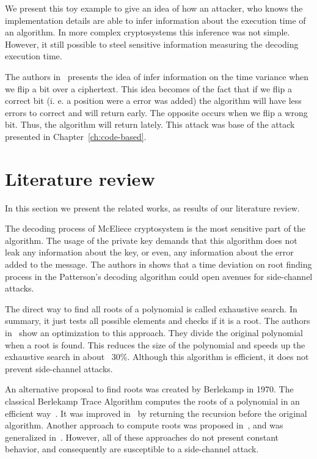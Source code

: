 We present this toy example to give an idea of how an attacker, who knows the implementation details are able to infer information about the execution time of an algorithm. In more complex cryptosystems this inference was not simple. However, it still possible to steel sensitive information measuring the decoding execution time.

The authors in~\cite{shoufan2009timing} presents the idea of infer information on the time variance when we flip a bit over a ciphertext. This idea becomes of the fact that if we flip a correct bit (i. e. a position were a error was added) the algorithm will have less errors to correct and will return early. The opposite occurs when we flip a wrong bit. Thus, the algorithm will return lately. This attack was base of the attack presented in Chapter~\ref{ch:code-based}.


\section{Literature review}
In this section we present the related works, as results of our literature review.

The decoding process of McEliece cryptosystem is the most sensitive part of the algorithm. The usage of the private key demands that this algorithm does not leak any information about the key, or even, any information about the error added to the message. The authors in \cite{bucerzan2017improved} shows that a time deviation on root finding process in the Patterson's decoding algorithm could open avenues for side-channel attacks. 

The direct way to find all roots of a polynomial is called exhaustive search. In summary, it just tests all possible elements and checks if it is a root. The authors in~\cite{strenzke2012fast} show an optimization to this approach. They divide the original polynomial when a root is found. This reduces the size of the polynomial and speeds up the exhaustive search in about ~30\%. Although this algorithm is efficient, it does not prevent side-channel attacks.

An alternative proposal to find roots was created by Berlekamp in 1970. The classical Berlekamp Trace Algorithm computes the roots of a polynomial in an efficient way~\cite{berlekamp1970factoring}. It was improved in~\cite{strenzke2012fast} by returning the recursion before the original algorithm. Another approach to compute roots was proposed in~\cite{fedorenko2002finding}, and was generalized in~\cite{Skachek2008,biswas2009}. However, all of these approaches do not present constant behavior, and consequently are susceptible to a side-channel attack.

